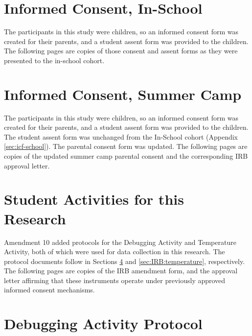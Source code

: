 


\section{Informed Consent, In-School}
\label{sec:icf:school}
The participants in this study were children, so an informed consent form was created for their parents, and a student assent form was provided to the children. The following pages are copies of those consent and assent forms as they were presented to the in-school cohort.




\section{Informed Consent, Summer Camp}
\label{sec:icf:camp}
The participants in this study were children, so an informed consent form was created for their parents, and a student assent form was provided to the children. The student assent form was unchanged from the In-School cohort (Appendix \ref{sec:icf-school}). The parental consent form was updated. The following pages are copies of the updated summer camp parental consent and the corresponding IRB approval letter.





\section{Student Activities for this Research}
Amendment 10 added protocols for the Debugging Activity and Temperature Activity, both of which were used for data collection in this research. The protocol documents follow in Sections \ref{sec:IRB:debugging} and \ref{sec:IRB:temperature}, respectively. The following pages are copies of the IRB amendment form, and the approval letter affirming that these instruments operate under previously approved informed consent mechanisms. 





\section{Debugging Activity Protocol}

\label{sec:IRB:debugging}


